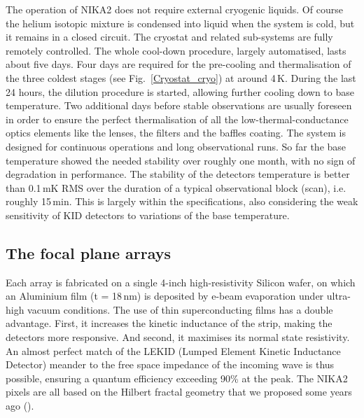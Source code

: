 \documentclass[]{aa} %
\begin{document}
The operation of NIKA2 does not require external cryogenic liquids. Of course the helium isotopic mixture is condensed into liquid when the system is cold, but it remains in a closed circuit. The cryostat and related sub-systems are fully remotely controlled. The whole cool-down procedure, largely automatised, lasts about five days. Four days are required for the pre-cooling and thermalisation of the three coldest stages (see Fig.~\ref{Cryostat_cryo}) at around 4\,K. During the last 24 hours, the dilution procedure is started, allowing further cooling down to base temperature. Two additional days before stable observations are usually foreseen in order to ensure the perfect thermalisation of all the low-thermal-conductance optics elements like the lenses, the filters and the baffles coating. The system is designed for continuous operations and long observational runs. So far the base temperature showed the needed stability over roughly one month, with no sign of degradation in performance. The stability of the detectors temperature is better than 0.1\,mK RMS over the duration of a typical observational block (scan), i.e. roughly 15\,min. This is largely within the specifications, also considering the weak sensitivity of KID detectors to variations of the base temperature. 


 \subsection{The focal plane arrays}

Each array is fabricated on a single 4-inch high-resistivity Silicon wafer, on which an Aluminium film (t = 18\,nm) is deposited by e-beam evaporation under ultra-high vacuum conditions. The use of thin superconducting films has a double advantage. First, it increases the kinetic inductance of the strip, making the detectors more responsive. And second, it maximises its normal state resistivity. An almost perfect match of the LEKID (Lumped Element Kinetic Inductance Detector) meander to the free space impedance of the incoming wave is thus possible, ensuring a quantum efficiency exceeding 90\% at the peak. The NIKA2 pixels are all based on the Hilbert fractal geometry that we proposed some years ago (\cite{Roesch2012}). 
\end{document}
